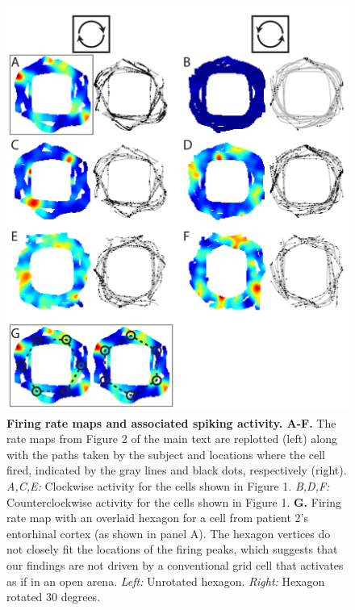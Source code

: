 \begin{figure}[bh]
\begin{center}
\includegraphics[width=.95\textwidth]{./tex/linearGrids/figs/supp_with_dots.pdf}
\caption[Firing rate maps and associated spiking activity]{\textbf{Firing rate maps and associated spiking activity. A-F. } The rate maps from Figure 2 of the main text are replotted (left) along with the paths taken by the subject and locations where the cell fired, indicated by the gray lines and black dots, respectively (right). \emph{A,C,E:} Clockwise activity for the cells shown in Figure 1. \emph{B,D,F:} Counterclockwise activity for the cells shown in Figure 1. \textbf{G. } Firing rate map with an overlaid hexagon for a cell from patient 2's entorhinal cortex (as shown in panel A). The hexagon vertices do not closely fit the locations of the firing peaks, which suggests that our findings are not driven by a conventional grid cell that activates as if in an open arena. \emph{Left:} Unrotated hexagon. \emph{Right:} Hexagon rotated 30 degrees.}
\end{center}
\end{figure}

